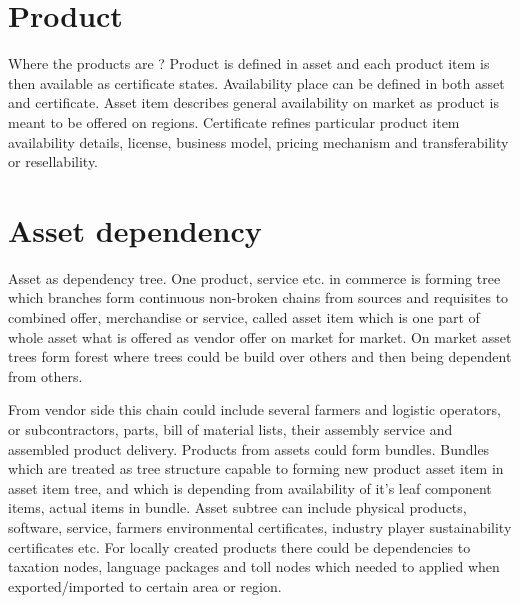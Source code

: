 \section{Product}
\label{product}
Where the products are ?
Product is defined in asset and each product item is then available as
certificate states. Availability place can be defined in both asset and
certificate. Asset item describes general availability on market as product is
meant to be offered on regions. Certificate refines particular product item
availability details, license, business model, pricing mechanism and
transferability or resellability.


\section{Asset dependency}
\label{dependency}
Asset as dependency tree.
One product, service etc. in commerce is forming tree which branches form
continuous non-broken chains from sources and requisites to combined offer,
merchandise or service, called asset item which is one part of whole asset
what is offered as vendor offer on market for market. On market asset trees
form forest where trees could be build over others and then being dependent
from others.

From vendor side this chain could include several farmers and logistic
operators, or subcontractors, parts, bill of material lists, their assembly
service and assembled product delivery. Products from assets could form
bundles. Bundles which are treated as tree structure capable to forming new
product asset item in asset item tree, and which is depending from
availability of it's leaf component items, actual items in bundle. Asset
subtree can include physical products, software, service, farmers
environmental certificates, industry player sustainability certificates etc.
For locally created products there could be dependencies to taxation nodes,
language packages and toll nodes which needed to applied when
exported/imported to certain area or region.

